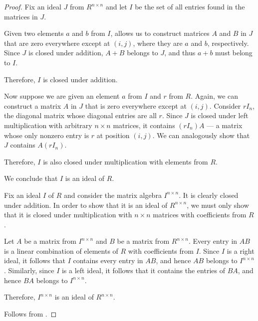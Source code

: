 \begin{proof}
   Fix an ideal \( J \) from \( R^{n \times n} \) and let \( I \) be the set of all entries found in the matrices in \( J \).

  Given two elements \( a \) and \( b \) from \( I \),  allows us to construct matrices \( A \) and \( B \) in \( J \) that are zero everywhere except at \( (i, j) \), where they are \( a \) and \( b \), respectively. Since \( J \) is closed under addition, \( A + B \) belongs to \( J \), and thus \( a + b \) must belong to \( I \).

  Therefore, \( I \) is closed under addition.

  Now suppose we are given an element \( a \) from \( I \) and \( r \) from \( R \). Again, we can construct a matrix \( A \) in \( J \) that is zero everywhere except at \( (i, j) \). Consider \( r I_n \), the diagonal matrix whose diagonal entries are all \( r \). Since \( J \) is closed under left multiplication with arbitrary \( n \times n \) matrices, it contains \( (r I_n) A \) --- a matrix whose only nonzero entry is \( r \) at position \( (i, j) \). We can analogously show that \( J \) contains \( A (r I_n) \).

  Therefore, \( I \) is also closed under multiplication with elements from \( R \).

  We conclude that \( I \) is an ideal of \( R \).

   Fix an ideal \( I \) of \( R \) and consider the matrix algebra \( I^{n \times n} \). It is clearly closed under addition. In order to show that it is an ideal of \( R^{n \times n} \), we must only show that it is closed under multiplication with \( n \times n \) matrices with coefficients from \( R \).

  Let \( A \) be a matrix from \( I^{n \times n} \) and \( B \) be a matrix from \( R^{n \times n} \). Every entry in \( AB \) is a linear combination of elements of \( R \) with coefficients from \( I \). Since \( I \) is a right ideal, it follows that \( I \) contains every entry in \( AB \), and hence \( AB \) belongs to \( I^{n \times n} \). Similarly, since \( I \) is a left ideal, it follows that it contains the entries of \( BA \), and hence \( BA \) belongs to \( I^{n \times n} \).

  Therefore, \( I^{n \times n} \) is an ideal of \( R^{n \times n} \).

   Follows from .
\end{proof}

